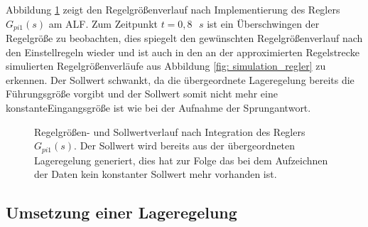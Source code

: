 			Abbildung \ref{fig: regler_real} zeigt den Regelgrößenverlauf nach Implementierung des Reglers $G_{pi1}(s)$ am ALF. Zum Zeitpunkt $t=0{,}8\text{ }\si{s}$ ist ein Überschwingen der Regelgröße zu beobachten, dies spiegelt den gewünschten Regelgrößenverlauf nach den Einstellregeln wieder und ist auch in den an der approximierten Regelstrecke simulierten Regelgrößenverläufe aus Abbildung \ref{fig: simulation_regler} zu erkennen. Der Sollwert schwankt, da die übergeordnete Lageregelung bereits die Führungsgröße vorgibt und der Sollwert somit nicht mehr eine konstanteEingangsgröße ist wie bei der Aufnahme der Sprungantwort.
			
			
		\begin{figure}[H]
				\centering
				\caption{Regelgrößen- und Sollwertverlauf nach Integration des Reglers $G_{pi1}(s)$. Der Sollwert wird bereits aus der übergeordneten Lageregelung generiert, dies hat zur Folge das bei dem Aufzeichnen der Daten kein konstanter Sollwert mehr vorhanden ist.}
				\label{fig: regler_real}
			\end{figure}
%			
					
			

		
		
		\subsection{Umsetzung einer Lageregelung}
			\label{subsec: Winkelregelung}
		
